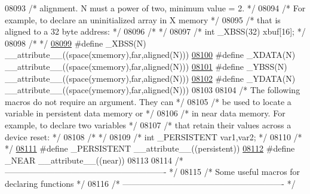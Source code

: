 \begin{DoxyCode}
08093 \textcolor{comment}{/* alignment. N must a power of two, minimum value = 2.       */}
08094 \textcolor{comment}{/* For example, to declare an uninitialized array in X memory */}
08095 \textcolor{comment}{/* that is aligned to a 32 byte address:                      */}
08096 \textcolor{comment}{/*                                                            */}
08097 \textcolor{comment}{/* int \_XBSS(32) xbuf[16];                                    */}
08098 \textcolor{comment}{/*                                                            */}
\hypertarget{a00015_source_l08099}{}\hyperlink{a00015_a126fa907a452cf251bfb5b5447d43a42}{08099} \textcolor{preprocessor}{#define \_XBSS(N)    \_\_attribute\_\_((space(xmemory),far,aligned(N)))}
\hypertarget{a00015_source_l08100}{}\hyperlink{a00015_ac1a6e2bc8e435c0104459a8c7b8377f2}{08100} \textcolor{preprocessor}{#define \_XDATA(N)   \_\_attribute\_\_((space(xmemory),far,aligned(N)))}
\hypertarget{a00015_source_l08101}{}\hyperlink{a00015_a68ddb6cce66bfc3f084c2b206517ebb8}{08101} \textcolor{preprocessor}{#define \_YBSS(N)    \_\_attribute\_\_((space(ymemory),far,aligned(N)))}
\hypertarget{a00015_source_l08102}{}\hyperlink{a00015_a62925741e70fa81d550c42ece6e43f78}{08102} \textcolor{preprocessor}{#define \_YDATA(N)   \_\_attribute\_\_((space(ymemory),far,aligned(N)))}
08103 
08104 \textcolor{comment}{/* The following macros do not require an argument. They can  */}
08105 \textcolor{comment}{/* be used to locate a variable in persistent data memory or  */}
08106 \textcolor{comment}{/* in near data memory. For example, to declare two variables */}
08107 \textcolor{comment}{/* that retain their values across a device reset:            */}
08108 \textcolor{comment}{/*                                                            */}
08109 \textcolor{comment}{/* int \_PERSISTENT var1,var2;                                 */}
08110 \textcolor{comment}{/*                                                            */}
\hypertarget{a00015_source_l08111}{}\hyperlink{a00015_a4916b19958daf3b6b9b322617cb53b44}{08111} \textcolor{preprocessor}{#define \_PERSISTENT \_\_attribute\_\_((persistent))}
\hypertarget{a00015_source_l08112}{}\hyperlink{a00015_aaa81df65726b230b5693f29eb2f3298c}{08112} \textcolor{preprocessor}{#define \_NEAR       \_\_attribute\_\_((near))}
08113 
08114 \textcolor{comment}{/* ---------------------------------------------------------- */}
08115 \textcolor{comment}{/* Some useful macros for declaring functions                 */}
08116 \textcolor{comment}{/* ---------------------------------------------------------- */}

\end{DoxyCode}
